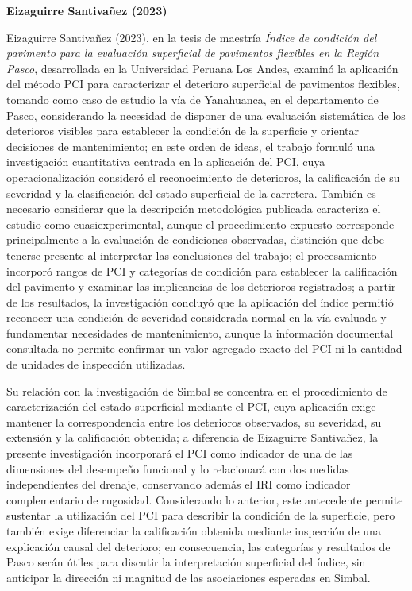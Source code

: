\noindent\textbf{Eizaguirre Santivañez (2023)}

Eizaguirre Santivañez (2023), en la tesis de maestría \textit{Índice de condición del pavimento para la evaluación superficial de pavimentos flexibles en la Región Pasco}, desarrollada en la Universidad Peruana Los Andes, examinó la aplicación del método PCI para caracterizar el deterioro superficial de pavimentos flexibles, tomando como caso de estudio la vía de Yanahuanca, en el departamento de Pasco, considerando la necesidad de disponer de una evaluación sistemática de los deterioros visibles para establecer la condición de la superficie y orientar decisiones de mantenimiento; en este orden de ideas, el trabajo formuló una investigación cuantitativa centrada en la aplicación del PCI, cuya operacionalización consideró el reconocimiento de deterioros, la calificación de su severidad y la clasificación del estado superficial de la carretera. También es necesario considerar que la descripción metodológica publicada caracteriza el estudio como cuasiexperimental, aunque el procedimiento expuesto corresponde principalmente a la evaluación de condiciones observadas, distinción que debe tenerse presente al interpretar las conclusiones del trabajo; el procesamiento incorporó rangos de PCI y categorías de condición para establecer la calificación del pavimento y examinar las implicancias de los deterioros registrados; a partir de los resultados, la investigación concluyó que la aplicación del índice permitió reconocer una condición de severidad considerada normal en la vía evaluada y fundamentar necesidades de mantenimiento, aunque la información documental consultada no permite confirmar un valor agregado exacto del PCI ni la cantidad de unidades de inspección utilizadas.

Su relación con la investigación de Simbal se concentra en el procedimiento de caracterización del estado superficial mediante el PCI, cuya aplicación exige mantener la correspondencia entre los deterioros observados, su severidad, su extensión y la calificación obtenida; a diferencia de Eizaguirre Santivañez,  la presente investigación incorporará el PCI como indicador de una de las dimensiones del desempeño funcional y lo relacionará con dos medidas independientes del drenaje, conservando además el IRI como indicador complementario de rugosidad. Considerando lo anterior, este antecedente permite sustentar la utilización del PCI para describir la condición de la superficie, pero también exige diferenciar la calificación obtenida mediante inspección de una explicación causal del deterioro; en consecuencia, las categorías y resultados de Pasco serán útiles para discutir la interpretación superficial del índice, sin anticipar la dirección ni magnitud de las asociaciones esperadas en Simbal.

